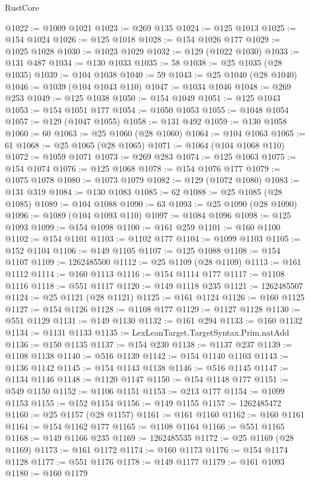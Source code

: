 \begin{lexlean}{RustCore}
\begin{coremodule}
@1022 := @1009 @1021
@1023 := @269 @135
@1024 := @125 @1013
@1025 := @154 @1024
@1026 := @125 @1018
@1028 := @154 @1026 @177
@1029 := @1025 @1028
@1030 := @1023 @1029
@1032 := @129 (@1022 @1030)
@1033 := @131 @487
@1034 := @130 @1033
@1035 := 58
@1038 := @25 @1035 (@28 @1035)
@1039 := @104 @1038
@1040 := 59
@1043 := @25 @1040 (@28 @1040)
@1046 := @1039 (@104 @1043 @110)
@1047 := @1034 @1046
@1048 := @269 @253
@1049 := @125 @1038
@1050 := @154 @1049
@1051 := @125 @1043
@1053 := @154 @1051 @177
@1054 := @1050 @1053
@1055 := @1048 @1054
@1057 := @129 (@1047 @1055)
@1058 := @131 @492
@1059 := @130 @1058
@1060 := 60
@1063 := @25 @1060 (@28 @1060)
@1064 := @104 @1063
@1065 := 61
@1068 := @25 @1065 (@28 @1065)
@1071 := @1064 (@104 @1068 @110)
@1072 := @1059 @1071
@1073 := @269 @283
@1074 := @125 @1063
@1075 := @154 @1074
@1076 := @125 @1068
@1078 := @154 @1076 @177
@1079 := @1075 @1078
@1080 := @1073 @1079
@1082 := @129 (@1072 @1080)
@1083 := @131 @319
@1084 := @130 @1083
@1085 := 62
@1088 := @25 @1085 (@28 @1085)
@1089 := @104 @1088
@1090 := 63
@1093 := @25 @1090 (@28 @1090)
@1096 := @1089 (@104 @1093 @110)
@1097 := @1084 @1096
@1098 := @125 @1093
@1099 := @154 @1098
@1100 := @161 @259
@1101 := @160 @1100
@1102 := @154 @1101
@1103 := @1102 @177
@1104 := @1099 @1103
@1105 := @152 @1104
@1106 := @149 @1105
@1107 := @125 @1088
@1108 := @154 @1107
@1109 := 1262485500
@1112 := @25 @1109 (@28 @1109)
@1113 := @161 @1112
@1114 := @160 @1113
@1116 := @154 @1114 @177
@1117 := @1108 @1116
@1118 := @551 @1117
@1120 := @149 @1118 @235
@1121 := 1262485507
@1124 := @25 @1121 (@28 @1121)
@1125 := @161 @1124
@1126 := @160 @1125
@1127 := @154 @1126
@1128 := @1108 @177
@1129 := @1127 @1128
@1130 := @551 @1129
@1131 := @149 @1130
@1132 := @161 @294
@1133 := @160 @1132
@1134 := @1131 @1133
@1135 := LexLeanTarget.TargetSyntax.Prim.natAdd
@1136 := @150 @1135
@1137 := @154 @230
@1138 := @1137 @237
@1139 := @1108 @1138
@1140 := @516 @1139
@1142 := @154 @1140 @1103
@1143 := @1136 @1142
@1145 := @154 @1143 @1138
@1146 := @516 @1145
@1147 := @1134 @1146
@1148 := @1120 @1147
@1150 := @154 @1148 @177
@1151 := @549 @1150
@1152 := @1106 @1151
@1153 := @213 @177
@1154 := @1099 @1153
@1155 := @152 @1154
@1156 := @149 @1155
@1157 := 1262485472
@1160 := @25 @1157 (@28 @1157)
@1161 := @161 @1160
@1162 := @160 @1161
@1164 := @154 @1162 @177
@1165 := @1108 @1164
@1166 := @551 @1165
@1168 := @149 @1166 @235
@1169 := 1262485535
@1172 := @25 @1169 (@28 @1169)
@1173 := @161 @1172
@1174 := @160 @1173
@1176 := @154 @1174 @1128
@1177 := @551 @1176
@1178 := @149 @1177
@1179 := @161 @1093
@1180 := @160 @1179

\end{coremodule}
\end{lexlean}

